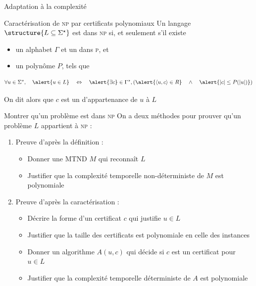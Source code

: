 
\begingroup

\begin{frame}{Adaptation à la complexité}

  \begin{block}{Caractérisation de \textsc{np} par certificats polynomiaux}
    Un langage $\structure{L \subseteq \Sigma^\star}$ est dans \alert{\textsc{np}}
    si, et seulement s'il existe
    \begin{itemize}
    \item un alphabet $\Gamma$ et un  dans \alert{\textsc{p}}, et
    \item un polynôme $P$,  tels que
    \end{itemize}

    \vspace{-2mm}
    $$
    \forall u \in \Sigma^\star,
    \quad
    \alert{u\in L}
    \quad \Leftrightarrow \quad 
    \alert{\exists c} \in \Gamma^\star,
    \left(
    \alert{\langle u,c \rangle \in R}
    \quad \land \quad
    \alert{|c| \le P(|u|)}
    \right)
    $$

    On dit alors que $c$ est un  d'appartenance de $u$ à $L$ 
  \end{block}

  \vspace{-2mm}
  \begin{alertblock}{Montrer qu'un problème est dans \textsc{np}}
    On a deux méthodes pour prouver qu'un problème $L$ appartient à \textsc{np} :
    \begin{enumerate}
    \item Preuve d'après la définition :
      \begin{itemize}
      \item Donner une MTND $M$ qui reconnaît $L$
      \item Justifier que la complexité temporelle non-déterministe de $M$ est polynomiale
      \end{itemize}
    \item Preuve d'après la caractérisation :
      \begin{itemize}
      \item Décrire la forme d'un \alert{certificat $c$} qui justifie $u \in L$
      \item Justifier que \alert{la taille} des certificats est \alert{polynomiale} en celle des instances 
      \item Donner un \alert{algorithme} $A(u, c)$ qui décide si $c$ est un certificat pour $u \in L$
      \item Justifier que la \alert{complexité} temporelle déterministe de $A$ est \alert{polynomiale}
      \end{itemize}
    \end{enumerate}
  \end{alertblock}

\end{frame}

\endgroup
\endinput
